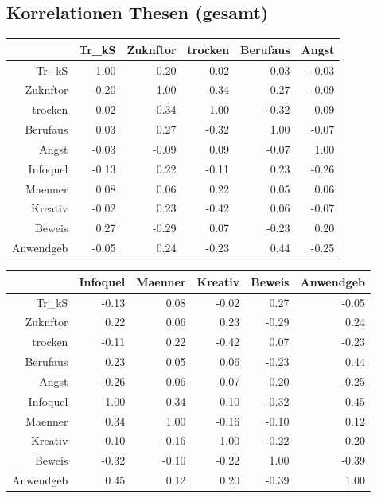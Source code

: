 \documentclass[12pt,a4paper,titlepage=true,parskip,ngerman]{scrartcl}
\begin{document}
\subsection{Korrelationen Thesen (gesamt)}
\begin{table}[ht]
\begin{tabular}{rrrrrr}
  \hline
 & Tr\_kS & Zuknftor & trocken & Berufaus & Angst \\ 
  \hline
Tr\_kS & 1.00 & -0.20 & 0.02 & 0.03 & -0.03 \\ 
  Zuknftor & -0.20 & 1.00 & -0.34 & 0.27 & -0.09 \\ 
  trocken & 0.02 & -0.34 & 1.00 & -0.32 & 0.09 \\ 
  Berufaus & 0.03 & 0.27 & -0.32 & 1.00 & -0.07 \\ 
  Angst & -0.03 & -0.09 & 0.09 & -0.07 & 1.00 \\ 
  Infoquel & -0.13 & 0.22 & -0.11 & 0.23 & -0.26 \\ 
  Maenner & 0.08 & 0.06 & 0.22 & 0.05 & 0.06 \\ 
  Kreativ & -0.02 & 0.23 & -0.42 & 0.06 & -0.07 \\ 
  Beweis & 0.27 & -0.29 & 0.07 & -0.23 & 0.20 \\ 
  Anwendgeb & -0.05 & 0.24 & -0.23 & 0.44 & -0.25 \\ 
   \hline
\end{tabular}

\bigskip

\begin{tabular}{rrrrrr}
  \hline
 & Infoquel & Maenner & Kreativ & Beweis & Anwendgeb \\ 
  \hline
Tr\_kS & -0.13 & 0.08 & -0.02 & 0.27 & -0.05 \\ 
  Zuknftor & 0.22 & 0.06 & 0.23 & -0.29 & 0.24 \\ 
  trocken & -0.11 & 0.22 & -0.42 & 0.07 & -0.23 \\ 
  Berufaus & 0.23 & 0.05 & 0.06 & -0.23 & 0.44 \\ 
  Angst & -0.26 & 0.06 & -0.07 & 0.20 & -0.25 \\ 
  Infoquel & 1.00 & 0.34 & 0.10 & -0.32 & 0.45 \\ 
  Maenner & 0.34 & 1.00 & -0.16 & -0.10 & 0.12 \\ 
  Kreativ & 0.10 & -0.16 & 1.00 & -0.22 & 0.20 \\ 
  Beweis & -0.32 & -0.10 & -0.22 & 1.00 & -0.39 \\ 
  Anwendgeb & 0.45 & 0.12 & 0.20 & -0.39 & 1.00 \\ 
   \hline
\end{tabular}
\end{table}
\end{document}
